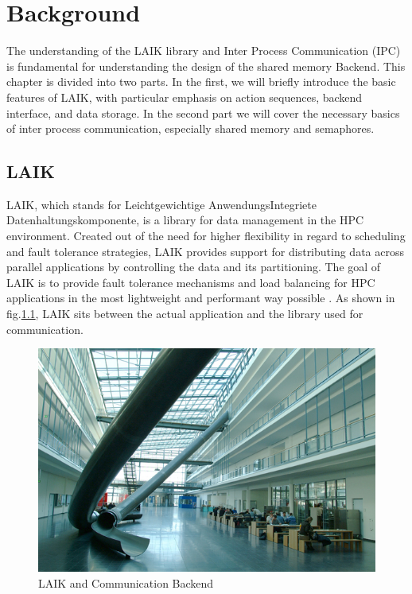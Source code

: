 
\chapter{Background}\label{chapter:background}

The understanding of the LAIK library and Inter Process Communication (IPC) is fundamental for understanding the design of the shared memory Backend. This chapter is divided into two parts. In the first, we will briefly introduce the basic features of LAIK, with particular emphasis on action sequences, backend interface, and data storage. In the second part we will cover the necessary basics of inter process communication, especially shared memory and semaphores.

\section{LAIK}

LAIK, which stands for \glqq Leichtgewichtige AnwendungsIntegriete Datenhaltungskomponente\grqq, is a library for data management in the HPC environment. Created out of the need for higher flexibility in regard to scheduling and fault tolerance strategies, LAIK provides support for distributing data across parallel applications by controlling the data and its partitioning. The goal of LAIK is to provide fault tolerance mechanisms and load balancing for HPC applications in the most lightweight and performant way possible \cite{laik-paper}. As shown in fig.\ref{fig:laik-layers}, LAIK sits between the actual application and the library used for communication.

\begin{figure}[h]
	\centering
	\includegraphics[scale=0.5]{figures/tum.jpg}
	\caption{LAIK and Communication Backend}
	\label{fig:laik-layers}
\end{figure}

